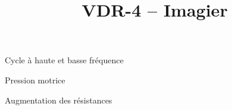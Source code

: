 \documentclass[aspectratio=169]{beamer}
\title{VDR-4 -- Imagier}
\institute{}
\begin{document}
\maketitle

\begin{frame}{Cycle à haute et basse fréquence}
	
\end{frame}

\begin{frame}{Pression motrice}
	
\end{frame}

\begin{frame}{Augmentation des résistances}
	
\end{frame}
\end{document}
